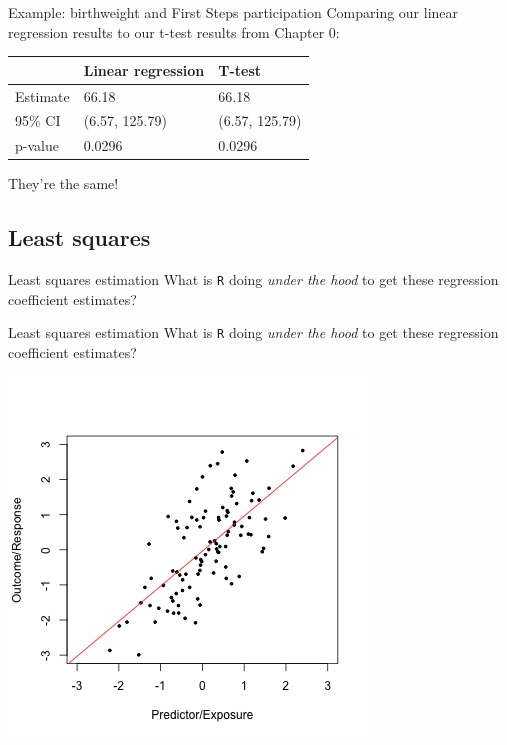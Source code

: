 \documentclass[10pt,t]{beamer}
\begin{document}
\begin{frame}{Example: birthweight and First Steps participation}
Comparing our linear regression results to our t-test results from Chapter 0:

\vspace{0.3cm}

\begin{table}[]
	\begin{tabular}{l|ll}
		& Linear regression & T-test         \\ \hline
		Estimate & 66.18             & 66.18          \\ \hline
		95\% CI  & (6.57, 125.79)    & (6.57, 125.79) \\ \hline
		p-value  & 0.0296            & 0.0296        
	\end{tabular}
\end{table}

\vspace{0.3cm}

They're the same!

\end{frame}

\subsection{Least squares}

\begin{frame}{Least squares estimation}
What is \texttt{R} doing \textit{under the hood} to get these regression coefficient estimates?
\end{frame}

\begin{frame}{Least squares estimation}
What is \texttt{R} doing \textit{under the hood} to get these regression coefficient estimates?

\vspace{0.3cm}

\centering \includegraphics[scale=0.45]{linear-regr.jpg}
\end{frame}
\end{document}
